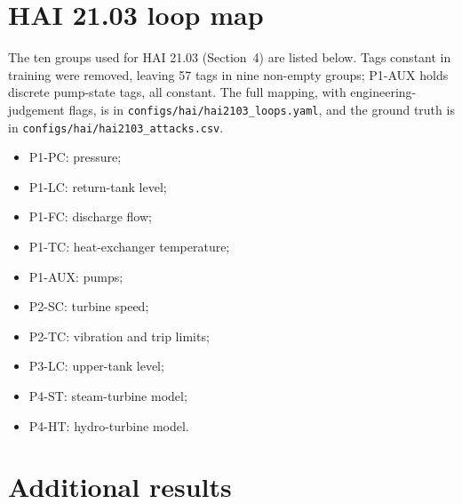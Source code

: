 \section{HAI 21.03 loop map}\label{app:loops}
The ten groups used for HAI 21.03 (Section~4) are listed below. Tags constant in training were removed, leaving 57 tags in nine non-empty groups; P1-AUX holds discrete pump-state tags, all constant. The full mapping, with engineering-judgement flags, is in \texttt{configs/hai/hai2103\_loops.yaml}, and the ground truth is in \texttt{configs/hai/hai2103\_attacks.csv}.
\begin{itemize}
\item P1-PC: pressure;
\item P1-LC: return-tank level;
\item P1-FC: discharge flow;
\item P1-TC: heat-exchanger temperature;
\item P1-AUX: pumps;
\item P2-SC: turbine speed;
\item P2-TC: vibration and trip limits;
\item P3-LC: upper-tank level;
\item P4-ST: steam-turbine model;
\item P4-HT: hydro-turbine model.
\end{itemize}

\section{Additional results}\label{app:extra}



